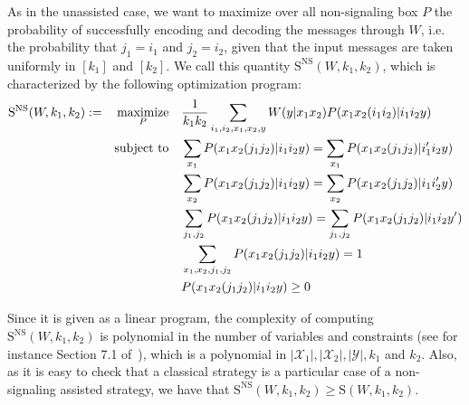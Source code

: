 As in the unassisted case, we want to maximize over all non-signaling box $P$ the probability of successfully encoding and decoding the messages through $W$, i.e. the probability that $j_1 = i_1$ and  $j_2 = i_2$, given that the input messages are taken uniformly in $[k_1]$ and $[k_2]$. We call this quantity $\mathrm{S^{\mathrm{NS}}}(W,k_1,k_2)$, which is characterized by the following optimization program:
\begin{equation}
  \begin{aligned}
    \mathrm{S}^{\mathrm{NS}}(W,k_1,k_2) := &&\underset{P}{\operatorname{\text{maximize}}} &&& \frac{1}{k_1k_2} \sum_{i_1,i_2,x_1,x_2,y} W(y|x_1x_2)P(x_1x_2(i_1i_2)|i_1i_2y)\\
    &&\operatorname{\text{subject to}} &&& \sum_{x_1} P(x_1x_2(j_1j_2)|i_1i_2y) = \sum_{x_1} P(x_1x_2(j_1j_2)|i_1'i_2y)\\
    &&&&& \sum_{x_2} P(x_1x_2(j_1j_2)|i_1i_2y) = \sum_{x_2} P(x_1x_2(j_1j_2)|i_1i_2'y)\\
    &&&&& \sum_{j_1,j_2} P(x_1x_2(j_1j_2)|i_1i_2y) = \sum_{j_1,j_2} P(x_1x_2(j_1j_2)|i_1i_2y')\\
    &&&&& \sum_{x_1,x_2,j_1,j_2} P(x_1x_2(j_1j_2)|i_1i_2y) = 1\\
    &&&&& P(x_1x_2(j_1j_2)|i_1i_2y) \geq 0
  \end{aligned}
\end{equation}

Since it is given as a linear program, the complexity of computing $\mathrm{S}^{\mathrm{NS}}(W,k_1,k_2)$ is polynomial in the number of variables and constraints (see for instance Section 7.1 of~\cite{GM07}), which is a polynomial in $|\mathcal{X}_1|,|\mathcal{X}_2|,|\mathcal{Y}|,k_1$ and $k_2$. Also, as it is easy to check that a classical strategy is a particular case of a non-signaling assisted strategy, we have that $\mathrm{S}^{\mathrm{NS}}(W,k_1,k_2) \geq \mathrm{S}(W,k_1,k_2)$.


